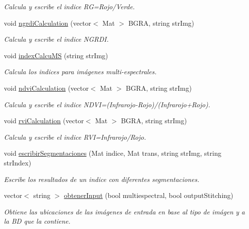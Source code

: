 \begin{DoxyCompactItemize}
\begin{DoxyCompactList}\small\item\em Calcula y escribe el indice RG=Rojo/\+Verde. \end{DoxyCompactList}\item 
void \mbox{\hyperlink{classIndexCalculation_ae42cea9b3bb253446995a80ae01ff429}{ngrdi\+Calculation}} (vector$<$ Mat $>$ B\+G\+RA, string str\+Img)
\begin{DoxyCompactList}\small\item\em Calcula y escribe el indice N\+G\+R\+DI. \end{DoxyCompactList}\item 
void \mbox{\hyperlink{classIndexCalculation_a9c19fb3bdd84afb8769c90a1e31857b3}{index\+Calcu\+MS}} (string str\+Img)
\begin{DoxyCompactList}\small\item\em Calcula los indices para imágenes multi-\/espectrales. \end{DoxyCompactList}\item 
void \mbox{\hyperlink{classIndexCalculation_a4d727b91eeb0676b3ffcfaf26ec02a32}{ndvi\+Calculation}} (vector$<$ Mat $>$ B\+G\+RA, string str\+Img)
\begin{DoxyCompactList}\small\item\em Calcula y escribe el indice N\+D\+VI=(Infrarojo-\/\+Rojo)/(Infrarojo+\+Rojo). \end{DoxyCompactList}\item 
void \mbox{\hyperlink{classIndexCalculation_abd44fe3dd27ccd9641f29152fdf19a2e}{rvi\+Calculation}} (vector$<$ Mat $>$ B\+G\+RA, string str\+Img)
\begin{DoxyCompactList}\small\item\em Calcula y escribe el indice R\+VI=Infrarojo/\+Rojo. \end{DoxyCompactList}\item 
void \mbox{\hyperlink{classIndexCalculation_acb0a9e1ded8f0d9550e7dad18e66058c}{escribir\+Segmentaciones}} (Mat indice, Mat trans, string str\+Img, string str\+Index)
\begin{DoxyCompactList}\small\item\em Escribe los resultados de un indice con diferentes segmentaciones. \end{DoxyCompactList}\item 
vector$<$ string $>$ \mbox{\hyperlink{classIndexCalculation_a65a88228b2caf575cbbac793a03d1dd6}{obtener\+Input}} (bool multiespectral, bool output\+Stitching)
\begin{DoxyCompactList}\small\item\em Obtiene las ubicaciones de las imágenes de entrada en base al tipo de imágen y a la BD que la contiene. \end{DoxyCompactList}\item 

\end{DoxyCompactItemize}
